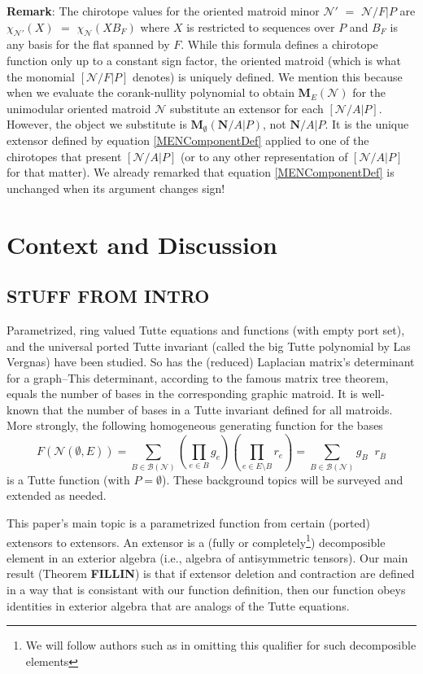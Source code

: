 \documentclass[12pt]{article}
\theoremstyle{definition}
\newcommand{\Remark}{\textbf{Remark}}
\newcommand{\scomp}[1]{\ensuremath{\overline{#1}}}
\newcommand{\ext}[1]{\ensuremath{\mathbf{#1}}}
\begin{document}
\Remark: The chirotope values for the oriented matroid minor
$\mathcal{N}'$ $=$ $\mathcal{N}/ F|P$ are
$\chi_{\mathcal{N}'}(X)$
$=$ $\chi_{\mathcal{N}}(XB_F)$ where $X$ is restricted to sequences
over $P$ and 
$B_F$ is any basis for the flat spanned by $F$.
While this formula
defines a chirotope function 
only up to a constant sign factor, the oriented matroid (which is what
the monomial $[\mathcal{N}/F|P]$ denotes) is uniquely defined.  We mention
this because when we evaluate the corank-nullity polynomial to obtain
$\ext{M}_E(\mathcal{N})$ for the unimodular oriented matroid 
$\mathcal{N}$
substitute an extensor 
for each $[\mathcal{N}/A|P]$.  
However, the object we
substitute is $\ext{M}_\emptyset(\ext{N}/A|P)$,
not $\ext{N}/A|P$.  It is the unique extensor defined by equation 
\eqref{MENComponentDef} applied to one of the chirotopes
that present $[\mathcal{N}/A|P]$ (or to any other representation
of $[\mathcal{N}/A|P]$ for that matter).  We already remarked that equation 
\eqref{MENComponentDef} is unchanged
when its argument changes sign!

\section{Context and Discussion}
\label{Context}

\subsection{STUFF FROM INTRO}




Parametrized, ring valued
Tutte equations and functions (with empty port set), and 
the universal ported Tutte invariant (called the big Tutte 
polynomial by Las Vergnas) have been studied.  So has
the (reduced) Laplacian matrix's determinant for a graph--This 
determinant, according to the famous matrix tree theorem, equals
the number of bases in the corresponding graphic matroid.  It is
well-known that the number of bases in a Tutte invariant defined
for all matroids.  More strongly, the following homogeneous generating
function for the bases
\[
F(\mathcal{N}(\emptyset,E))=
\sum_{B\in\mathcal{B}(\mathcal{N})}
\left(\prod_{e\in B} g_e
\right)
\left(\prod_{e\in E\setminus B} r_e
\right)
=
\sum_{B\in\mathcal{B}(\mathcal{N})}
g_B\;\;r_{\scomp{B}}
\]
is a Tutte function (with $P=\emptyset$).
These background topics will be surveyed and extended as needed.


This paper's main topic is a parametrized function from certain
(ported) extensors to extensors.  An extensor is a 
(fully or completely\footnote{We will follow authors such as
\cite{JacobsonI} in omitting this qualifier for such decomposible elements})
decomposible element in an exterior algebra (i.e., algebra of antisymmetric
tensors).  Our main result (Theorem \textbf{FILLIN}) is that 
if extensor deletion and contraction are defined in a way that is
consistant with our function definition, then our function obeys 
identities in exterior algebra that are analogs of the Tutte 
equations.  
\end{document}
